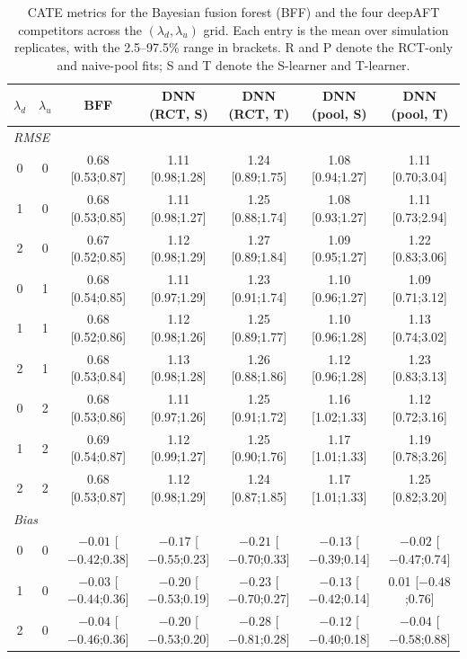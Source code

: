 \begin{table}
  \centering
  \caption{CATE metrics for the Bayesian fusion forest (BFF) and the four
    deepAFT competitors across the $(\lambda_d, \lambda_u)$ grid. Each entry
    is the mean over simulation replicates, with the 2.5--97.5\% range in
    brackets. R and P denote the RCT-only and naive-pool fits; S and T denote
    the S-learner and T-learner.}
  \label{tab:sim-deepaft}
  \scriptsize
  \setlength{\tabcolsep}{4pt}
  \begin{tabular}{cc ccccc}
    \toprule
    $\lambda_d$ & $\lambda_u$ & BFF & DNN (RCT, S) & DNN (RCT, T) & DNN (pool, S) & DNN (pool, T) \\
    \midrule
    \multicolumn{7}{l}{\emph{RMSE}}\\
    0 & 0 & 0.68 [0.53;0.87] & 1.11 [0.98;1.28] & 1.24 [0.89;1.75] & 1.08 [0.94;1.27] & 1.11 [0.70;3.04] \\
    1 & 0 & 0.68 [0.53;0.85] & 1.11 [0.98;1.27] & 1.25 [0.88;1.74] & 1.08 [0.93;1.27] & 1.11 [0.73;2.94] \\
    2 & 0 & 0.67 [0.52;0.85] & 1.12 [0.98;1.29] & 1.27 [0.89;1.84] & 1.09 [0.95;1.27] & 1.22 [0.83;3.06] \\
    0 & 1 & 0.68 [0.54;0.85] & 1.11 [0.97;1.29] & 1.23 [0.91;1.74] & 1.10 [0.96;1.27] & 1.09 [0.71;3.12] \\
    1 & 1 & 0.68 [0.52;0.86] & 1.12 [0.98;1.26] & 1.25 [0.89;1.77] & 1.10 [0.96;1.28] & 1.13 [0.74;3.02] \\
    2 & 1 & 0.68 [0.53;0.84] & 1.13 [0.98;1.28] & 1.26 [0.88;1.86] & 1.12 [0.96;1.28] & 1.23 [0.83;3.13] \\
    0 & 2 & 0.68 [0.53;0.86] & 1.11 [0.97;1.26] & 1.25 [0.91;1.72] & 1.16 [1.02;1.33] & 1.12 [0.72;3.16] \\
    1 & 2 & 0.69 [0.54;0.87] & 1.12 [0.99;1.27] & 1.25 [0.90;1.76] & 1.17 [1.01;1.33] & 1.19 [0.78;3.26] \\
    2 & 2 & 0.68 [0.53;0.87] & 1.12 [0.98;1.29] & 1.24 [0.87;1.85] & 1.17 [1.01;1.33] & 1.25 [0.82;3.20] \\
    \midrule
    \multicolumn{7}{l}{\emph{Bias}}\\
    0 & 0 & $-0.01$ [$-0.42$;0.38] & $-0.17$ [$-0.55$;0.23] & $-0.21$ [$-0.70$;0.33] & $-0.13$ [$-0.39$;0.14] & $-0.02$ [$-0.47$;0.74] \\
    1 & 0 & $-0.03$ [$-0.44$;0.36] & $-0.20$ [$-0.53$;0.19] & $-0.23$ [$-0.70$;0.27] & $-0.13$ [$-0.42$;0.14] & 0.01 [$-0.48$;0.76] \\
    2 & 0 & $-0.04$ [$-0.46$;0.36] & $-0.20$ [$-0.53$;0.20] & $-0.28$ [$-0.81$;0.28] & $-0.12$ [$-0.40$;0.18] & $-0.04$ [$-0.58$;0.88] \\

\end{tabular}
\end{table}
